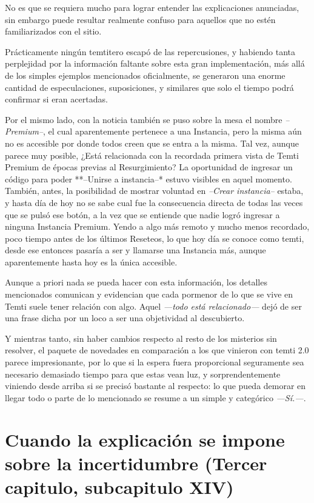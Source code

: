 \documentclass[
  spanish,
]{book}
\begin{document}
No es que se requiera mucho para lograr entender las explicaciones anunciadas, sin embargo puede resultar realmente confuso para aquellos que no estén familiarizados con el sitio.

Prácticamente ningún temtitero escapó de las repercusiones, y habiendo tanta perplejidad por la información faltante sobre esta gran implementación, más allá de los simples ejemplos mencionados oficialmente, se generaron una enorme cantidad de especulaciones, suposiciones, y similares que solo el tiempo podrá confirmar si eran acertadas.

Por el mismo lado, con la noticia también se puso sobre la mesa el nombre \emph{--Premium--}, el cual aparentemente pertenece a una Instancia, pero la misma aún no es accesible por donde todos creen que se entra a la misma. Tal vez, aunque parece muy posible, ¿Está relacionada con la recordada primera vista de Temti Premium de épocas previas al Resurgimiento?
La oportunidad de ingresar un código para poder **--Unirse a instancia--* estuvo visibles en aquel momento. También, antes, la posibilidad de mostrar voluntad en \emph{--Crear instancia--} estaba, y hasta día de hoy no se sabe cual fue la consecuencia directa de todas las veces que se pulsó ese botón, a la vez que se entiende que nadie logró ingresar a ninguna Instancia Premium.
Yendo a algo más remoto y mucho menos recordado, poco tiempo antes de los últimos Reseteos, lo que hoy día se conoce como temti, desde ese entonces pasaría a ser y llamarse una Instancia más, aunque aparentemente hasta hoy es la única accesible.

Aunque a priori nada se pueda hacer con esta información, los detalles mencionados comunican y evidencian que cada pormenor de lo que se vive en Temti suele tener relación con algo. Aquel \emph{---todo está relacionado---} dejó de ser una frase dicha por un loco a ser una objetividad al descubierto.

Y mientras tanto, sin haber cambios respecto al resto de los misterios sin resolver, el paquete de novedades en comparación a los que vinieron con temti 2.0 parece impresionante, por lo que si la espera fuera proporcional seguramente sea necesario demasiado tiempo para que estas vean luz, y sorprendentemente viniendo desde arriba si se precisó bastante al respecto: lo que pueda demorar en llegar todo o parte de lo mencionado se resume a un simple y categórico \emph{---Sí.---}.

\hypertarget{cuando-la-explicaciuxf3n-se-impone-sobre-la-incertidumbre-tercer-capitulo-subcapitulo-xiv}{%
\section{Cuando la explicación se impone sobre la incertidumbre (Tercer capitulo, subcapitulo XIV)}\label{cuando-la-explicaciuxf3n-se-impone-sobre-la-incertidumbre-tercer-capitulo-subcapitulo-xiv}}
\end{document}
